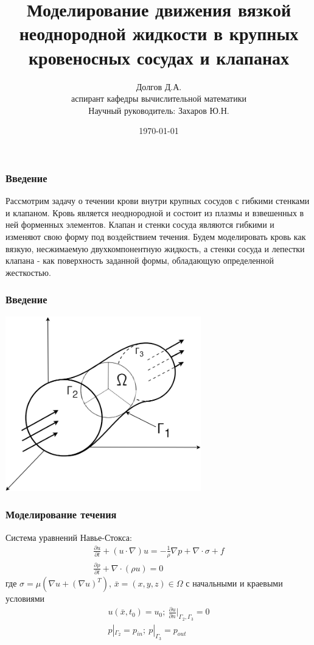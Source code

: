 \documentclass[14pt]{beamer}
\title[Моделирование движения жидкости в сосудах и клапанах]{Моделирование движения вязкой неоднородной жидкости в крупных кровеносных сосудах и клапанах}
\date{\today}
\author[Долгов Д.А.]{Долгов Д.А.\\ {\small аспирант кафедры вычислительной математики}\\ {\small Научный руководитель: Захаров Ю.Н.}}
\institute{Кемеровский Государственный Университет \\
    \vspace{0.7cm}
    \vspace{0.7cm}
}
\begin{document}
\maketitle

\begin{frame}
\frametitle{Введение}
Рассмотрим задачу о течении крови внутри крупных сосудов с гибкими стенками и клапаном. Кровь является неоднородной и состоит из плазмы и взвешенных в ней форменных элементов. Клапан и стенки сосуда являются гибкими и изменяют свою форму под воздействием течения. Будем моделировать кровь как вязкую, несжимаемую двухкомпонентную жидкость, а стенки сосуда и лепестки клапана - как поверхность заданной формы, обладающую определенной жесткостью.
\end{frame}

\begin{frame}
\frametitle{Введение}
    \begin{center}
        \includegraphics[width=8.5cm]{area_3d.png}
    \end{center}
\end{frame}

\begin{frame}
\frametitle{Моделирование течения}
Система уравнений Навье-Стокса:
\begin{gather}
    \label{eq:motion}
    \frac{\partial u}{\partial t} + (u \cdot \nabla) u = - \frac{1}{\rho} \nabla p + \nabla \cdot \sigma + f\\
    \label{eq:continuity}
    \frac{\partial \rho}{\partial t} + \nabla \cdot (\rho u) = 0 
\end{gather}
где $\sigma = \mu (\nabla u + (\nabla u)^{T})$, $\bar{x} = (x, y, z) \in \Omega$ с начальными и краевыми условиями
\begin{gather*}
    u(\bar{x}, t_0) = u_0;\ \frac{\partial u}{\partial n}|_{\Gamma_2, \Gamma_3} = 0\\
    p|_{\Gamma_2} = p_{in};\ p|_{\Gamma_3} = p_{out} \\
\end{gather*}

\end{frame}
\end{document}
